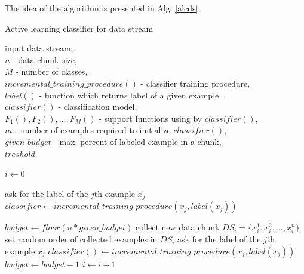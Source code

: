 The idea of the algorithm is presented in Alg. \ref{alcds}.

\begin{algorithm}
\caption{Active learning classifier for data stream}
\label{alcds}
\begin{algorithmic}[1]
\REQUIRE  input data stream, \\$n$ - data chunk size, \\$M$ - number of classes, \\$incremental\_training\_ procedure()$ - classifier training procedure, \\
$label()$ - function which returns label of a given example, \\$classifier()$ - classification model, \\$F_1(),F_2(),...,F_M()$ - support functions using by $classifier()$, \\$m$ - number of examples required to initialize $classifier()$, \\$given\_budget$ - max. percent of labeled example in a chunk, \\$treshold$

\STATE $i \leftarrow 0$

\STATE ask for the label of the $j$th example $x_j$
\STATE $classifier \leftarrow  incremental\_training\_ procedure(x_j, label(x_j))$
\ENDFOR

\REPEAT
\STATE $budget \leftarrow floor(n*given\_budget)$
\STATE collect new data chunk $DS_i=\{x_i^1,x_i^2,...,x_i^n \}$
	\STATE set random order of collected examples in $DS_i$
			\STATE ask for the label of the $j$th example $x_j$
			\STATE $classifier() \leftarrow incremental\_training\_procedure(x_j, label(x_j))$
			\STATE $budget \leftarrow budget-1$
		\ENDIF
	\ENDIF
	\ENDFOR
    \STATE $i \leftarrow i+1$
\end{algorithmic}
\end{algorithm}


